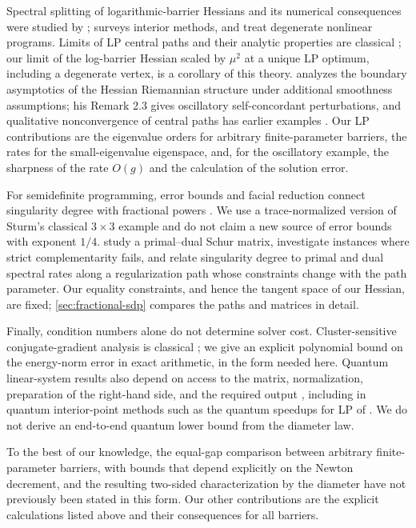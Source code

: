 Spectral splitting of logarithmic-barrier Hessians and its numerical
consequences were studied by \citet{wright1994,wright1998};
\citet{forsgren2002} surveys interior methods, and
\citet{wrightorban2002} treat degenerate nonlinear programs. Limits of
LP central paths and their analytic properties are classical
\citep{adler1991,guler1994,halicka1999}; our limit of the log-barrier
Hessian scaled by $\mu^2$ at a unique LP optimum, including a
degenerate vertex, is a corollary of this theory.
\citet{duistermaat2001} analyzes the boundary asymptotics of the Hessian
Riemannian structure under additional smoothness assumptions; his Remark
2.3 gives oscillatory self-concordant perturbations, and qualitative
nonconvergence of central paths has earlier examples
\citep{boltepauwels2022}. Our LP contributions are the eigenvalue orders
for arbitrary finite-parameter barriers, the rates for the
small-eigenvalue eigenspace, and, for the oscillatory example, the
sharpness of the rate $O(g)$ and the calculation of the solution error.

For semidefinite programming, error bounds and facial reduction connect
singularity degree with fractional powers
\citep{sturm2000,drusvyatskiy2017,lourenco2021}. We use a
trace-normalized version of Sturm's classical $3\times3$ example and do
not claim a new source of error bounds with exponent $1/4$.
\citet{alizadeh1998} study a primal--dual Schur matrix, \citet{wei2010}
investigate instances where strict complementarity fails, and
\citet{sremac2021} relate singularity degree to primal and dual spectral
rates along a regularization path whose constraints change with the
path parameter. Our equality constraints, and hence the tangent space of
our Hessian, are fixed; \cref{sec:fractional-sdp} compares the paths and
matrices in detail.

Finally, condition numbers alone do not determine solver cost.
Cluster-sensitive conjugate-gradient analysis is classical
\citep{axelsson1994}; we give an explicit polynomial bound on the
energy-norm error in exact arithmetic, in the form needed here. Quantum
linear-system results also depend on access to the matrix,
normalization, preparation of the right-hand side, and the required
output \citep{gilyen2019,orsucci2021}, including in quantum
interior-point methods such as the quantum speedups for LP of
\citet{apersgribling2026}. We do not derive an end-to-end quantum lower
bound from the diameter law.

To the best of our knowledge, the equal-gap comparison between
arbitrary finite-parameter barriers, with bounds that depend explicitly
on the Newton decrement, and the resulting two-sided characterization by
the diameter have not previously been stated in this form. Our other
contributions are the explicit calculations listed above and their
consequences for all barriers.

